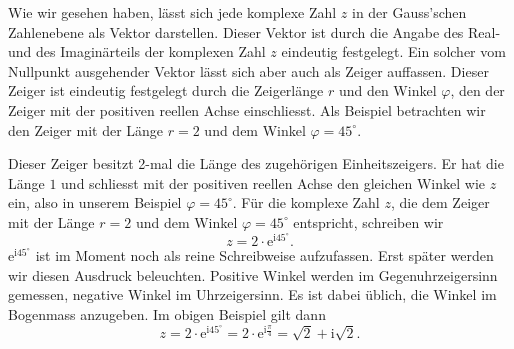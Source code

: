 \documentclass[%
11pt,%
twoside,%
titlepage,%
german,%
headsepline%
]{scrartcl}
\begin{document}
Wie wir gesehen haben, lässt sich jede komplexe Zahl $z$ in der Gauss'schen Zahlenebene als Vektor darstellen. Dieser Vektor ist durch die Angabe des Real- und des Imaginärteils der komplexen Zahl $z$ eindeutig festgelegt.
Ein solcher vom Nullpunkt ausgehender Vektor lässt sich aber auch als Zeiger auffassen. Dieser Zeiger ist eindeutig festgelegt durch die Zeigerlänge $r$ und den Winkel $\varphi$, den der Zeiger mit der positiven reellen Achse einschliesst.
Als Beispiel betrachten wir den Zeiger mit der Länge $r = 2$ und dem Winkel $\varphi=45^\circ$.
\begin{center}
\end{center}
Dieser Zeiger besitzt 2-mal die Länge des zugeh\"origen Einheitszeigers. Er hat die Länge $1$ und schliesst mit der positiven reellen Achse den gleichen Winkel wie $z$ ein, also in unserem Beispiel $\varphi=45^\circ$.
F\"ur die komplexe Zahl $z$, die dem Zeiger mit der Länge $r = 2$ und dem Winkel $\varphi=45^\circ$ entspricht, schreiben wir
$$z=2\cdot \mathrm{e}^{\mathrm{i} 45^\circ}.$$
$\mathrm{e}^{\mathrm{i} 45^\circ}$ ist im Moment noch als reine Schreibweise aufzufassen. Erst später werden wir diesen Ausdruck beleuchten. Positive Winkel werden im Gegenuhrzeigersinn gemessen, negative Winkel im Uhrzeigersinn. Es ist dabei \"ublich, die Winkel im Bogenmass anzugeben. Im obigen Beispiel gilt dann
$$z=2\cdot \mathrm{e}^{\mathrm{i} 45^\circ}=2\cdot \mathrm{e}^{\mathrm{i} \frac{\pi}{4}}=\sqrt{2}+\mathrm{i}\sqrt{2}.$$
\end{document}
